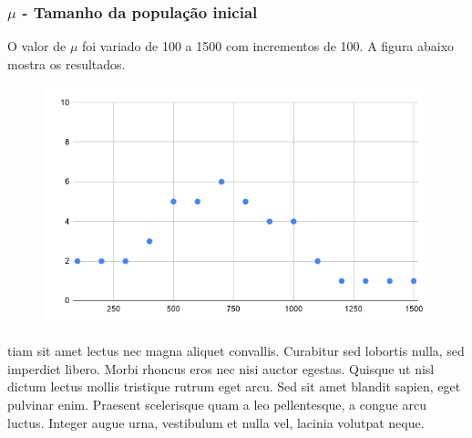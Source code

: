 \documentclass{article}
\begin{document}
\subsubsection{$\mu$ - Tamanho da população inicial}
\quad O valor de $\mu$ foi variado de 100 a 1500 com incrementos de 100. A figura abaixo mostra os resultados.
\begin{figure}[H]
\centering
\includegraphics[scale=0.35]{placeholder}
\end{figure}
\quad tiam sit amet lectus nec magna aliquet convallis. Curabitur sed lobortis nulla, sed imperdiet libero. Morbi rhoncus eros nec nisi auctor egestas. Quisque ut nisl dictum lectus mollis tristique rutrum eget arcu. Sed sit amet blandit sapien, eget pulvinar enim. Praesent scelerisque quam a leo pellentesque, a congue arcu luctus. Integer augue urna, vestibulum et nulla vel, lacinia volutpat neque.
\end{document}

